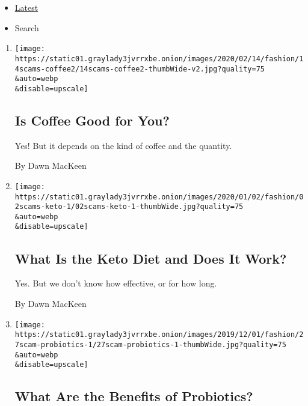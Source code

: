 \begin{itemize}
\tightlist
\item
  \protect\hyperlink{stream-panel}{Latest}
\item
  Search
\end{itemize}

\begin{enumerate}
\def\labelenumi{\arabic{enumi}.}
\item
  \href{/2020/02/13/style/self-care/coffee-benefits.html}{}

  \texttt{[image: https://static01.graylady3jvrrxbe.onion/images/2020/02/14/fashion/14scams-coffee2/14scams-coffee2-thumbWide-v2.jpg?quality=75\\\&auto=webp\\\&disable=upscale]}

  \hypertarget{is-coffee-good-for-you}{%
  \subsection{Is Coffee Good for You?}\label{is-coffee-good-for-you}}

  Yes! But it depends on the kind of coffee and the quantity.

  By Dawn MacKeen
\item
  \href{/2020/01/02/style/self-care/keto-diet-explained-benefits.html}{}

  \texttt{[image: https://static01.graylady3jvrrxbe.onion/images/2020/01/02/fashion/02scams-keto-1/02scams-keto-1-thumbWide.jpg?quality=75\\\&auto=webp\\\&disable=upscale]}

  \hypertarget{what-is-the-keto-diet-and-does-it-work}{%
  \subsection{What Is the Keto Diet and Does It
  Work?}\label{what-is-the-keto-diet-and-does-it-work}}

  Yes. But we don't know how effective, or for how long.

  By Dawn MacKeen
\item
  \href{/2019/11/27/style/self-care/probiotics-benefits.html}{}

  \texttt{[image: https://static01.graylady3jvrrxbe.onion/images/2019/12/01/fashion/27scam-probiotics-1/27scam-probiotics-1-thumbWide.jpg?quality=75\\\&auto=webp\\\&disable=upscale]}

  \hypertarget{what-are-the-benefits-of-probiotics}{%
  \subsection{What Are the Benefits of
  Probiotics?}\label{what-are-the-benefits-of-probiotics}}


\end{enumerate}
